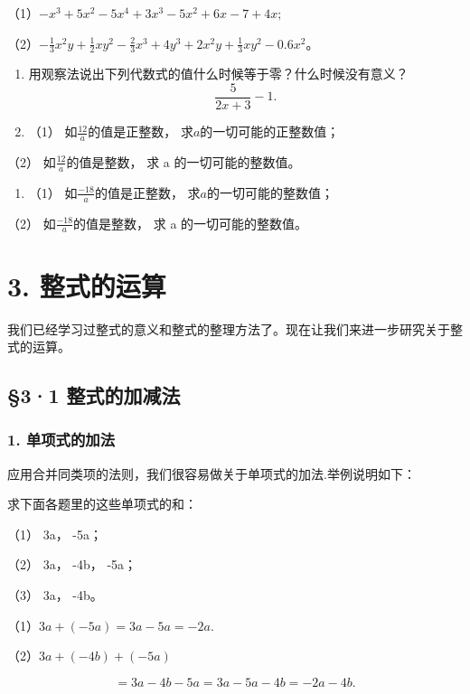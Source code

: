 （1）\(-x^{3} + 5x^{2} - 5x^{4} + 3x^{3} - 5x^{2} + 6x - 7 + 4x;\)

（2）\(-\frac{1}{3} x^{2}y + \frac{1}{2} xy^{2} - \frac{2}{3} x^{3} + 4y^{3} + 2x^{2}y + \frac{1}{3} xy^{2} - 0.6x^{2}\)。

\begin{enumerate}[start=8]
\item
  用观察法说出下列代数式的值什么时候等于零？什么时候没有意义？
\[
\frac{5}{2 x + 3} - 1.
\]
\item
  （1） 如\(\frac{12}{a}\)的值是正整数， 求\(a\)的一切可能的正整数值；
\end{enumerate}

（2） 如\(\frac{12}{a}\)的值是整数， 求 a 的一切可能的整数值。

\begin{enumerate}[start=10]
\item
  （1） 如\(\frac{-18}{a}\)的值是正整数， 求\(a\)的一切可能的整数值；
\end{enumerate}

（2） 如\(\frac{-18}{a}\)的值是整数， 求 a 的一切可能的整数值。

\chapter{3. 整式的运算}

我们已经学习过整式的意义和整式的整理方法了。现在让我们来进一步研究关于整式的运算。

\section{§3·1 整式的加减法}

\subsection{1. 单项式的加法}

应用合并同类项的法则，我们很容易做关于单项式的加法.举例说明如下：

 求下面各题里的这些单项式的和：

（1） 3a， -5a；

（2） 3a， -4b， -5a；

（3） 3a， -4b。

 （1）\(3a + (-5a) = 3a - 5a = -2a.\)

（2）\(3a + (-4b) + (-5a)\)

\[
= 3 a - 4 b - 5 a = 3 a - 5 a - 4 b = - 2 a - 4 b.
\]

